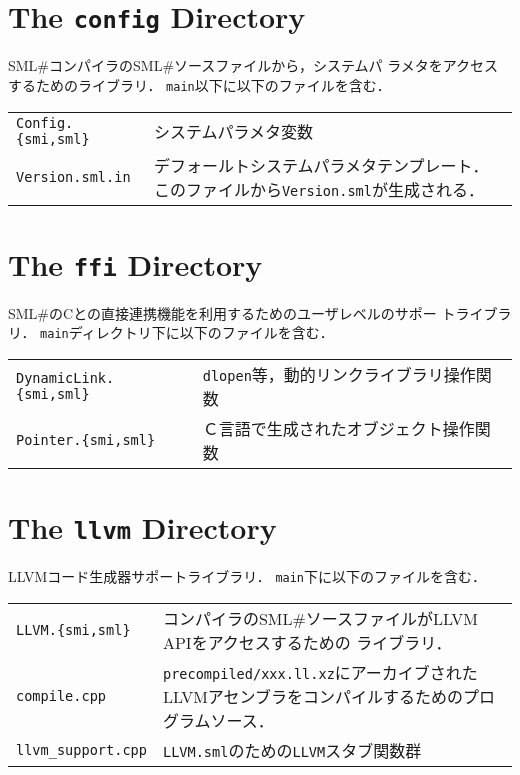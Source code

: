 \documentclass{jbook}
\newcommand{\txt}[2]{#2}
\newcommand{\smlsharp}{SML\#}
\newcommand{\code}[1]{\mbox{\large\tt #1}}
\begin{document}
\else%
\fi%

\section{\txt{\code{config}ディレクトリ}{The \code{config} Directory}}
\ifjp%
	\smlsharp{}コンパイラの\smlsharp{}ソースファイルから，システムパ
ラメタをアクセスするためのライブラリ．
	\code{main}以下に以下のファイルを含む．

\begin{tabular}{ll}
\code{Config.\{smi,sml\}} & システムパラメタ変数
\\
\code{Version.sml.in} & デフォールトシステムパラメタテンプレート．
    このファイルから\code{Version.sml}が生成される．
\end{tabular}
\else%
\fi%


\section{\txt{\code{ffi}ディレクトリ}{The \code{ffi} Directory}}
\ifjp%
	\smlsharp{}のCとの直接連携機能を利用するためのユーザレベルのサポー
トライブラリ．
	\code{main}ディレクトリ下に以下のファイルを含む．

\begin{tabular}{ll}
\code{DynamicLink.\{smi,sml\}} & \code{dlopen}等，動的リンクライブラリ操作関数
\\
\code{Pointer.\{smi,sml\}} & Ｃ言語で生成されたオブジェクト操作関数
\end{tabular}
\else%
\fi%


\section{\txt{\code{llvm}ディレクトリ}{The \code{llvm} Directory}}
\ifjp%
	LLVMコード生成器サポートライブラリ．
	\code{main}下に以下のファイルを含む．

\begin{tabular}{ll}
\code{LLVM.\{smi,sml\}} & 
コンパイラの\smlsharp{}ソースファイルがLLVM APIをアクセスするための
ライブラリ．
\\
\code{compile.cpp} & 
\code{precompiled/xxx.ll.xz}にアーカイブされたLLVMアセンブラをコンパイルするためのプログラムソース．
\\
\code{llvm\_support.cpp} & 
\code{LLVM.sml}のための\code{LLVM}スタブ関数群
\end{tabular}
\else%
\fi%
\end{document}
